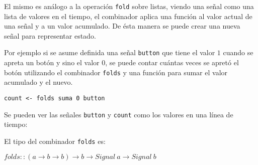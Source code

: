   El mismo es análogo a la operación \texttt{fold} sobre listas, viendo
una señal como una lista de valores en el tiempo, el combinador aplica una
función al valor actual de una señal y a un valor acumulado.
  De ésta manera se puede crear una nueva señal para representar estado.

  Por ejemplo si se asume definida una señal \texttt{button} que tiene
el valor $1$ cuando se apreta un botón y sino el valor $0$, se puede
contar cuántas veces se apretó el botón utilizando el combinador \texttt{folds}
y una función para sumar el valor acumulado y el nuevo.

\begin{center}
\begin{Verbatim}[frame=single]
count <- folds suma 0 button
\end{Verbatim}
\end{center}

Se pueden ver las señales \texttt{button} y \texttt{count} como los
valores en una línea de tiempo:



El tipo del combinador \texttt{folds} es:

\begin{center}
$folds :: (a \rightarrow b \rightarrow b) \rightarrow b \rightarrow Signal\ a \rightarrow Signal\ b$
\end{center}

